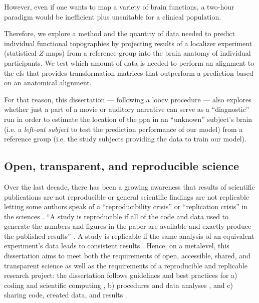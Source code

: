 %
However, even if one wants to map a variety of brain functions, a two-hour
paradigm would be inefficient plus unsuitable for a clinical population.

%
Therefore, we explore a method and the quantity of data needed
to predict individual functional topographies by projecting results of a
localizer experiment (statistical $Z$-maps) from a reference group into the
brain anatomy of individual participants.
%
We test which amount of data is needed to perform an alignment
to the \ac{cfs} that provides transformation matrices that
outperform a prediction based on an anatomical alignment.

%
For that reason, this dissertation --- following a \ac{loocv} procedure --- also
explores whether just a part of a movie or auditory narrative can serve as a
``diagnostic'' run in order to estimate the location of the \ac{ppa} in an
``unknown'' subject's brain (i.e. a \textit{left-out subject} to test the
prediction performance of our model) from a reference group (i.e. the study
subjects providing the data to train our model).


\subsection{Open, transparent, and reproducible science}

Over the last decade, there has been a growing awareness that results of
scientific publications are not reproducible or general scientific findings are
not replicable letting some authors speak of a ``reproducibility crisis'' or
``replication crisis'' in the sciences \citep{baker2016reproducibility,
plesser2018reproducibility, stupple2019reproducibility, nosek2022replicability}.
``A study is reproducible if all of the code and data used to generate the
numbers and figures in the paper are available and exactly produce the published
results'' \citep{leek2017most}.
A study is replicable if the same analysis of an equivalent experiment's data
leads to consistent results \citep{dubois2016building, leek2017most}.
%
Hence, on a metalevel, this dissertation aims to meet both the requirements of
open, accessible, shared, and transparent science \citep{watson2015will,
fecher2014open} as well as the requirements of a reproducible and replicable
research project:
%
the dissertation follows guidelines and best practices for a) coding and
scientific computing \citep{wilson2014best}, b) procedures and data analyses
\citep{nichols2017best, poldrack2017scanning, poldrack2019establishment}, and c)
sharing code, created data, and results \citep{eglen2017toward, nichols2017best,
pernet2015improving}.


